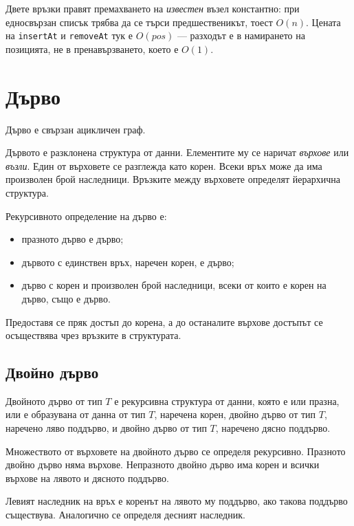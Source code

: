 Двете връзки правят премахването на \emph{известен} възел константно: при
едносвързан списък трябва да се търси предшественикът, тоест $O(n)$. Цената на
\verb|insertAt| и \verb|removeAt| тук е $O(\mathit{pos})$ --- разходът е в
намирането на позицията, не в пренавързването, което е $O(1)$.

\section{Дърво}\label{s:18.6}

\begin{defn}[Дърво]
Дърво е свързан ацикличен граф.
\end{defn}

Дървото е разклонена структура от данни. Елементите му се наричат \emph{върхове} или \emph{възли}. Един от върховете се разглежда като корен. Всеки връх може да има произволен брой наследници. Връзките между върховете определят йерархична структура.

Рекурсивното определение на дърво е:

\begin{itemize}
    \item празното дърво е дърво;
    \item дървото с единствен връх, наречен корен, е дърво;
    \item дърво с корен и произволен брой наследници, всеки от които е корен на дърво, също е дърво.
\end{itemize}

Предоставя се пряк достъп до корена, а до останалите върхове достъпът се осъществява чрез връзките в структурата.

\subsection{Двойно дърво}\label{s:18.6.1}

\begin{defn}
Двойното дърво от тип $T$ е рекурсивна структура от данни, която е или празна, или е образувана от данна от тип $T$, наречена корен, двойно дърво от тип $T$, наречено ляво поддърво, и двойно дърво от тип $T$, наречено дясно поддърво.
\end{defn}

Множеството от върховете на двойното дърво се определя рекурсивно. Празното двойно дърво няма върхове. Непразното двойно дърво има корен и всички върхове на лявото и дясното поддърво.

Левият наследник на връх е коренът на лявото му поддърво, ако такова поддърво съществува. Аналогично се определя десният наследник.

